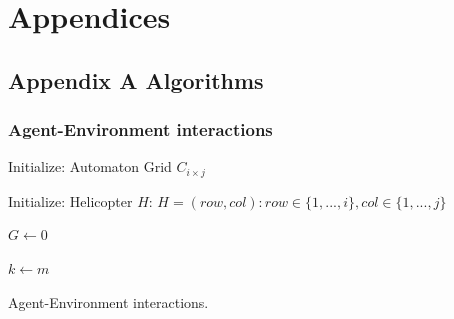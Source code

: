 \documentclass[
  12pt,
  openany]{book}
\begin{document}
\hypertarget{appendices}{%
\chapter*{Appendices}\label{appendices}}

\hypertarget{appendix-a-algorithms}{%
\section{Appendix A Algorithms}\label{appendix-a-algorithms}}

\hypertarget{agent-environment-interactions}{%
\subsection{Agent-Environment interactions}\label{agent-environment-interactions}}

\newcommand\mycommfont[1]{\small\ttfamily\textcolor{olive}{#1}}
\begin{algorithm}[H]
\DontPrintSemicolon
\SetAlgoLined
{}
\BlankLine
{}

Initialize: Automaton Grid $C_{i \times j}$

Initialize: Helicopter $H$: $H = (row, col): row \in \{1,...,i\}, col \in \{1,...,j\}$

$G \longleftarrow 0$

$k \longleftarrow m$

\caption{Agent-Environment interactions.}
\end{algorithm}
\end{document}
